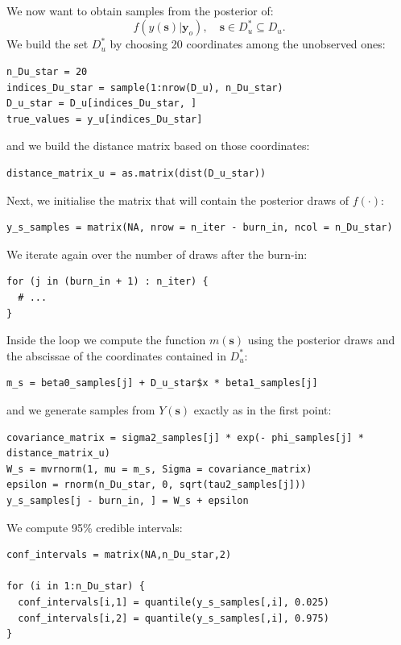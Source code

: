 \documentclass[a4paper,12pt]{article}
\begin{document}
\subsection{}
We now want to obtain samples from the posterior of:
\begin{equation*}
    f(y(\boldsymbol{s}) | \boldsymbol{y}_o), \quad \boldsymbol{s} \in D_u^* \subseteq D_u.
\end{equation*}
We build the set \(D_u^*\) by choosing 20 coordinates among the unobserved ones:
\begin{lstlisting}[style=R]
n_Du_star = 20
indices_Du_star = sample(1:nrow(D_u), n_Du_star)
D_u_star = D_u[indices_Du_star, ]
true_values = y_u[indices_Du_star]
\end{lstlisting}
and we build the distance matrix based on those coordinates:
\begin{lstlisting}[style=R]
distance_matrix_u = as.matrix(dist(D_u_star))
\end{lstlisting}
Next, we initialise the matrix that will contain the posterior draws of \(f(\cdot)\):
\begin{lstlisting}[style=R]
y_s_samples = matrix(NA, nrow = n_iter - burn_in, ncol = n_Du_star)
\end{lstlisting}
We iterate again over the number of draws after the burn-in:
\begin{lstlisting}[style=R]
for (j in (burn_in + 1) : n_iter) {
  # ...
}
\end{lstlisting}
Inside the loop we compute the function \(m(\boldsymbol{s})\) using the posterior draws and the abscissae of the coordinates contained in \(D_u^*\):
\begin{lstlisting}[style=R]
m_s = beta0_samples[j] + D_u_star$x * beta1_samples[j]
\end{lstlisting}
and we generate samples from \(Y(\boldsymbol{s})\) exactly as in the first point:
\begin{lstlisting}[style=R]
covariance_matrix = sigma2_samples[j] * exp(- phi_samples[j] * distance_matrix_u)
W_s = mvrnorm(1, mu = m_s, Sigma = covariance_matrix)
epsilon = rnorm(n_Du_star, 0, sqrt(tau2_samples[j]))
y_s_samples[j - burn_in, ] = W_s + epsilon
\end{lstlisting}
We compute 95\% credible intervals:
\begin{lstlisting}[style=R]
conf_intervals = matrix(NA,n_Du_star,2)

for (i in 1:n_Du_star) {
  conf_intervals[i,1] = quantile(y_s_samples[,i], 0.025)
  conf_intervals[i,2] = quantile(y_s_samples[,i], 0.975)
}
\end{lstlisting}
\end{document}
